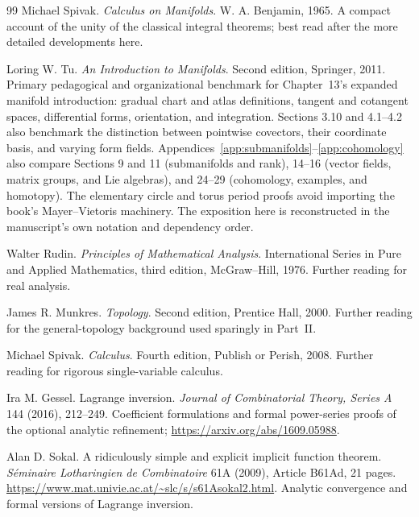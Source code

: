 \begin{thebibliography}{99}
Michael Spivak. \emph{Calculus on Manifolds}. W. A. Benjamin, 1965.
\newblock A compact account of the unity of the classical integral theorems;
best read after the more detailed developments here.

Loring W. Tu. \emph{An Introduction to Manifolds}. Second edition,
Springer, 2011.
\newblock Primary pedagogical and organizational benchmark for Chapter~13's
expanded manifold introduction: gradual chart and atlas definitions,
tangent and cotangent spaces, differential forms, orientation, and integration.
Sections 3.10 and 4.1--4.2 also benchmark the distinction between
pointwise covectors, their coordinate basis, and varying form fields.
Appendices~\ref{app:submanifolds}--\ref{app:cohomology} also compare Sections 9 and 11 (submanifolds and rank),
14--16 (vector fields, matrix groups, and Lie algebras), and 24--29
(cohomology, examples, and homotopy). The elementary circle and torus
period proofs avoid importing the book's Mayer--Vietoris machinery.
The exposition here is reconstructed in the manuscript's own notation
and dependency order.

Walter Rudin.
\newblock \emph{Principles of Mathematical Analysis}.
\newblock International Series in Pure and Applied Mathematics, third edition,
McGraw--Hill, 1976.
\newblock Further reading for real analysis.

James R. Munkres.
\newblock \emph{Topology}.
\newblock Second edition, Prentice Hall, 2000.
\newblock Further reading for the general-topology background used sparingly
in Part~II.

Michael Spivak.
\newblock \emph{Calculus}.
\newblock Fourth edition, Publish or Perish, 2008.
\newblock Further reading for rigorous single-variable calculus.

Ira M. Gessel. Lagrange inversion.
\emph{Journal of Combinatorial Theory, Series A} 144 (2016), 212--249.
\newblock Coefficient formulations and formal power-series proofs of the
optional analytic refinement; \url{https://arxiv.org/abs/1609.05988}.

Alan D. Sokal. A ridiculously simple and explicit implicit function theorem.
\emph{S\'eminaire Lotharingien de Combinatoire} 61A (2009), Article B61Ad,
21 pages. \url{https://www.mat.univie.ac.at/~slc/s/s61Asokal2.html}.
\newblock Analytic convergence and formal versions of Lagrange inversion.


\end{thebibliography}
